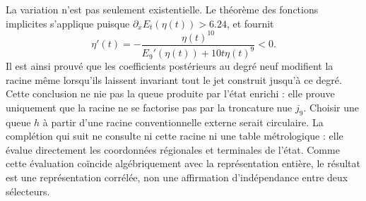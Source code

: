 La variation n'est pas seulement existentielle. Le théorème des fonctions implicites s'applique puisque \(\partial_xE_t(\eta(t))>6.24\), et fournit
\begin{equation}
 \eta'(t)=-
 \frac{\eta(t)^{10}}
 {E_9'(\eta(t))+10t\eta(t)^9}<0.
 \label{eq:alpha-variacion-raiz-prolongacion}
\end{equation}
Il est ainsi prouvé que les coefficients postérieurs au degré neuf modifient
la racine même lorsqu’ils laissent invariant tout le jet construit jusqu’à ce degré.
Cette conclusion ne nie pas la queue produite par l’état enrichi : elle prouve
uniquement que la racine ne se factorise pas par la troncature nue
\(j_9\). Choisir une queue \(h\) à partir d’une racine conventionnelle externe
serait circulaire. La complétion qui suit ne consulte ni cette racine ni une table
métrologique : elle évalue directement les coordonnées régionales et terminales de
l’état. Comme cette évaluation coïncide algébriquement avec la représentation
entière, le résultat est une représentation corrélée, non une affirmation
d’indépendance entre deux sélecteurs.


\endinput

\subsubsection{Lecteur complet, naturalité et cylindres communs}

Soit \(F_{\mathsf s}\) le corps des coefficients de la signature de \(\mathsf s\in\mathcal X_\alpha^{\mathrm{enr}}\) et soit \(d_m=6+3m\). On définit
\[
 \mathfrak J_m:=\coprod_{\mathsf s\in\mathcal X_\alpha^{\mathrm{enr}}}
 \{\mathsf s\}\times F_{\mathsf s}[X]/(X^{d_m+1}),\qquad
 \Gamma_m(\mathsf s)=
 \bigl(\mathsf s,E_{21/22}^{(d_m)}(\mathsf s;X)\bigr).
\]
Le lecteur complet enregistré \(\Gamma_{E21}\) produit ces représentations. Pour \(m'\ge m\), la troncature \(
 \tau_{m',m}(\mathsf s,[f]_{d_{m'}})
 =(\mathsf s,[f]_{d_m})
\) satisfait
\begin{equation}
 \tau_{m',m}\circ\Gamma_{m'}=\Gamma_m,
 \qquad
 E_{21/22}:=\varprojlim_mE_{21/22}^{(d_m)}.
 \tag{A3}
 \label{eq:alpha-sistema-analitico-completo}
\end{equation}
On n'ajoute pas de section de la troncature nue. Si l'on explicite la représentation des trois coefficients suivants, celle-ci est la projection dérivée
\[
 \Lambda_{d_m+1:d_m+3}
 :=\operatorname{pr}_{d_m+1:d_m+3}\circ
   \Gamma_{E21}\circ\mathcal U_{\mathrm{TPK}},
\]
et non un générateur indépendant ni une lecture de la valeur cible.

